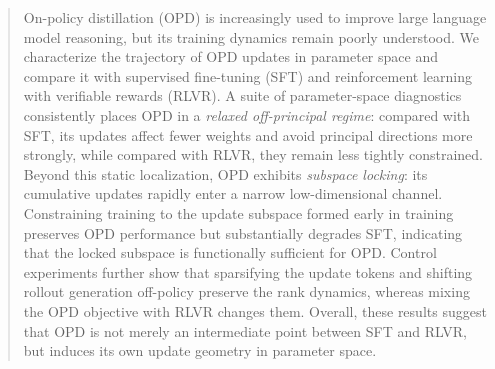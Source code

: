 \begin{abstract}
On-policy distillation (OPD) is increasingly used to improve large language model reasoning, but its training dynamics remain poorly understood. We characterize the trajectory of OPD updates in parameter space and compare it with supervised fine-tuning (SFT) and reinforcement learning with verifiable rewards (RLVR). A suite of parameter-space diagnostics consistently places OPD in a \emph{relaxed off-principal regime}: compared with SFT, its updates affect
fewer weights and avoid principal directions more strongly, while compared
with RLVR, they remain less tightly constrained. Beyond this static localization, OPD exhibits \emph{subspace locking}: its cumulative updates rapidly enter a narrow low-dimensional channel.
Constraining training to the update subspace formed early in training preserves OPD performance but substantially degrades SFT, indicating that the locked subspace is functionally sufficient for OPD.
Control experiments further show that sparsifying the update tokens and shifting rollout generation off-policy preserve the rank dynamics, whereas mixing the OPD objective with RLVR changes them. Overall, these results suggest that OPD is not merely an intermediate point between SFT and RLVR, but induces its own update geometry in parameter space.
\end{abstract}